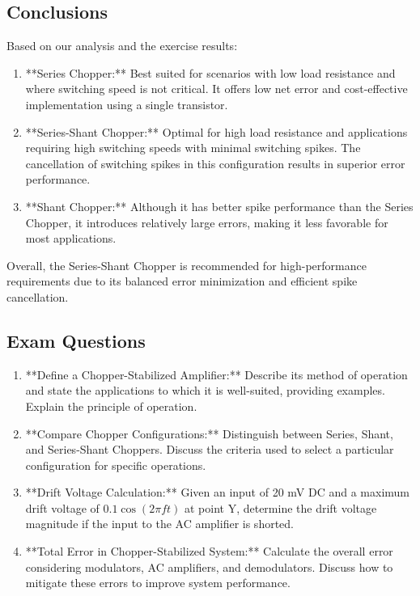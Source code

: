 \subsection{Conclusions}
Based on our analysis and the exercise results:
\begin{enumerate}
    \item **Series Chopper:** Best suited for scenarios with low load resistance and where switching speed is not critical. It offers low net error and cost-effective implementation using a single transistor.
    \item **Series-Shant Chopper:** Optimal for high load resistance and applications requiring high switching speeds with minimal switching spikes. The cancellation of switching spikes in this configuration results in superior error performance.
    \item **Shant Chopper:** Although it has better spike performance than the Series Chopper, it introduces relatively large errors, making it less favorable for most applications.
\end{enumerate}
Overall, the Series-Shant Chopper is recommended for high-performance requirements due to its balanced error minimization and efficient spike cancellation.

\subsection{Exam Questions}
\begin{enumerate}
    \item **Define a Chopper-Stabilized Amplifier:** Describe its method of operation and state the applications to which it is well-suited, providing examples. Explain the principle of operation.
    \item **Compare Chopper Configurations:** Distinguish between Series, Shant, and Series-Shant Choppers. Discuss the criteria used to select a particular configuration for specific operations.
    \item **Drift Voltage Calculation:** Given an input of 20 mV DC and a maximum drift voltage of \( 0.1 \cos(2\pi f t) \) at point Y, determine the drift voltage magnitude if the input to the AC amplifier is shorted.
    \item **Total Error in Chopper-Stabilized System:** Calculate the overall error considering modulators, AC amplifiers, and demodulators. Discuss how to mitigate these errors to improve system performance.
\end{enumerate}

